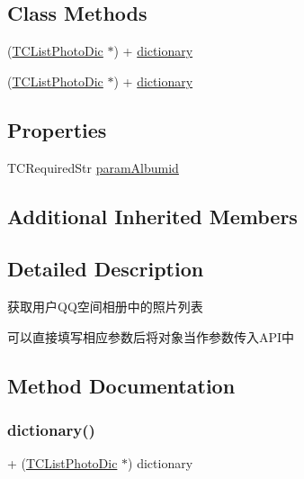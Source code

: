 \subsection*{Class Methods}
\begin{DoxyCompactItemize}
\item 
(\mbox{\hyperlink{interface_t_c_list_photo_dic}{T\+C\+List\+Photo\+Dic}} $\ast$) + \mbox{\hyperlink{interface_t_c_list_photo_dic_ac2269339e26ec904e2d34d5ffda87b6f}{dictionary}}
\item 
(\mbox{\hyperlink{interface_t_c_list_photo_dic}{T\+C\+List\+Photo\+Dic}} $\ast$) + \mbox{\hyperlink{interface_t_c_list_photo_dic_ac2269339e26ec904e2d34d5ffda87b6f}{dictionary}}
\end{DoxyCompactItemize}
\subsection*{Properties}
\begin{DoxyCompactItemize}
\item 
T\+C\+Required\+Str \mbox{\hyperlink{interface_t_c_list_photo_dic_a73beb6a8b3b5674cd1f94ba349bcf02b}{param\+Albumid}}
\end{DoxyCompactItemize}
\subsection*{Additional Inherited Members}


\subsection{Detailed Description}
获取用户\+Q\+Q空间相册中的照片列表 

可以直接填写相应参数后将对象当作参数传入\+A\+P\+I中 

\subsection{Method Documentation}
\mbox{\label{interface_t_c_list_photo_dic_ac2269339e26ec904e2d34d5ffda87b6f}} 
\subsubsection{\texorpdfstring{dictionary()}{dictionary()}\hspace{0.1cm}{\footnotesize\ttfamily [1/2]}}
{\footnotesize\ttfamily + (\mbox{\hyperlink{interface_t_c_list_photo_dic}{T\+C\+List\+Photo\+Dic}} $\ast$) dictionary \begin{DoxyParamCaption}{ }\end{DoxyParamCaption}}


